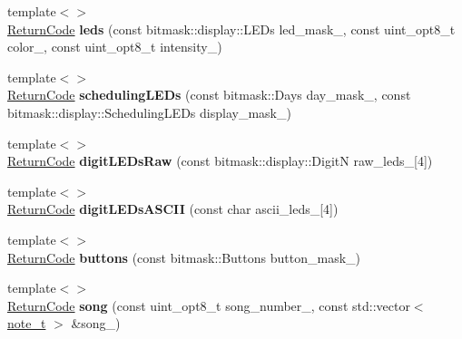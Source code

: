 \begin{DoxyCompactItemize}
\item 
\hypertarget{classroomba_1_1_open_interface_a74bb06a7a0472e96457f1c8b985cea04}{{\footnotesize template$<$$>$ }\\\hyperlink{namespaceroomba_aff53babe0af88b1ea8b066fd18b8f23f}{Return\+Code} {\bfseries leds} (const bitmask\+::display\+::\+L\+E\+Ds led\+\_\+mask\+\_\+, const uint\+\_\+opt8\+\_\+t color\+\_\+, const uint\+\_\+opt8\+\_\+t intensity\+\_\+)}\label{classroomba_1_1_open_interface_a74bb06a7a0472e96457f1c8b985cea04}

\item 
\hypertarget{classroomba_1_1_open_interface_a0ef2ddfc6780a95c0338926e8dd4729c}{{\footnotesize template$<$$>$ }\\\hyperlink{namespaceroomba_aff53babe0af88b1ea8b066fd18b8f23f}{Return\+Code} {\bfseries scheduling\+L\+E\+Ds} (const bitmask\+::\+Days day\+\_\+mask\+\_\+, const bitmask\+::display\+::\+Scheduling\+L\+E\+Ds display\+\_\+mask\+\_\+)}\label{classroomba_1_1_open_interface_a0ef2ddfc6780a95c0338926e8dd4729c}

\item 
\hypertarget{classroomba_1_1_open_interface_ad8a1463655e2440d640bc2f0f88acd33}{{\footnotesize template$<$$>$ }\\\hyperlink{namespaceroomba_aff53babe0af88b1ea8b066fd18b8f23f}{Return\+Code} {\bfseries digit\+L\+E\+Ds\+Raw} (const bitmask\+::display\+::\+Digit\+N raw\+\_\+leds\+\_\+\mbox{[}4\mbox{]})}\label{classroomba_1_1_open_interface_ad8a1463655e2440d640bc2f0f88acd33}

\item 
\hypertarget{classroomba_1_1_open_interface_ab823644bdd658865f8197f1ffc4a559d}{{\footnotesize template$<$$>$ }\\\hyperlink{namespaceroomba_aff53babe0af88b1ea8b066fd18b8f23f}{Return\+Code} {\bfseries digit\+L\+E\+Ds\+A\+S\+C\+I\+I} (const char ascii\+\_\+leds\+\_\+\mbox{[}4\mbox{]})}\label{classroomba_1_1_open_interface_ab823644bdd658865f8197f1ffc4a559d}

\item 
\hypertarget{classroomba_1_1_open_interface_a239dadf1f8d8989fbe9e198be725ee9d}{{\footnotesize template$<$$>$ }\\\hyperlink{namespaceroomba_aff53babe0af88b1ea8b066fd18b8f23f}{Return\+Code} {\bfseries buttons} (const bitmask\+::\+Buttons button\+\_\+mask\+\_\+)}\label{classroomba_1_1_open_interface_a239dadf1f8d8989fbe9e198be725ee9d}

\item 
\hypertarget{classroomba_1_1_open_interface_a2dca15b6fb291bcec211bd80a26c38bb}{{\footnotesize template$<$$>$ }\\\hyperlink{namespaceroomba_aff53babe0af88b1ea8b066fd18b8f23f}{Return\+Code} {\bfseries song} (const uint\+\_\+opt8\+\_\+t song\+\_\+number\+\_\+, const std\+::vector$<$ \hyperlink{namespaceroomba_a19e8ac8a2208a1a44fa9273930cf7451}{note\+\_\+t} $>$ \&song\+\_\+)}\label{classroomba_1_1_open_interface_a2dca15b6fb291bcec211bd80a26c38bb}


\end{DoxyCompactItemize}
